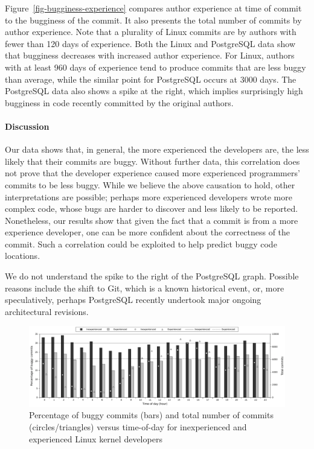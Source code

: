 Figure~\ref{fig-bugginess-experience} compares author experience at time of
commit to the bugginess of the commit. It also presents the total number of
commits by author experience. Note that a plurality of Linux commits are by
authors with fewer than 120 days of experience.  Both the Linux and PostgreSQL
data show that bugginess decreases with increased author experience. For Linux,
authors with at least 960 days of experience tend to produce commits that are
less buggy than average, while the similar point for PostgreSQL occurs at 3000
days.  The PostgreSQL data also shows a spike at the right, which implies
surprisingly high bugginess in code recently committed by the original authors.

\paragraph{Discussion}

Our data shows that, in general, the more experienced the developers are, the
less likely that their commits are buggy.  Without further data, this
correlation does not prove that the developer experience caused more experienced
programmers' commits to be less buggy.  While we believe the above causation to
hold, other interpretations are possible; perhaps more experienced developers
wrote more complex code, whose bugs are harder to discover and less likely to be
reported.  Nonetheless, our results show that given the fact that a commit is
from a more experience developer, one can be more confident about the
correctness of the commit. Such a correlation could be exploited to help predict
buggy code locations.

We do not understand the spike to the right of the PostgreSQL graph.  Possible
reasons include the shift to Git, which is a known historical event, or, more
speculatively, perhaps PostgreSQL recently undertook major ongoing architectural
revisions.

\begin{figure}[tbh]
\includegraphics[width=\textwidth]{linux-bugginess-hour-experienced.pdf}
\caption{\label{fig-linux-bugginess-experienced}Percentage of buggy commits
  (bars) and total number of commits (circles/triangles) versus time-of-day for
  inexperienced and experienced Linux kernel developers}
\end{figure}

